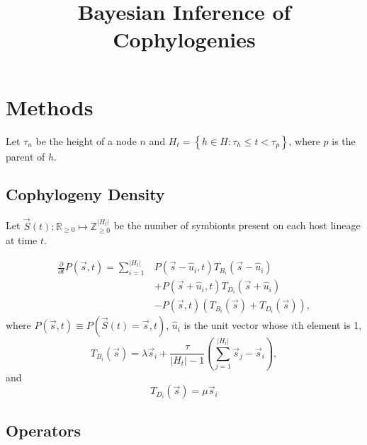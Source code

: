 \documentclass{article}
\title{Bayesian Inference of Cophylogenies}
\begin{document}
    \section*{Methods}

        Let $\tau_n$ be the height of a node $n$ and $H_t = \left\{h \in H:
        \tau_h \leq t < \tau_p\right\}$, where $p$ is the parent of $h$.

        \subsection*{Cophylogeny Density}

            Let $\vec{S}\left(t\right) : \mathbb{R}_{\geq 0} \mapsto
            \mathbb{Z}_{\geq 0}^{\lvert{H_t}\rvert}$ be the number of symbionts
            present on each host lineage at time $t$.

            \begin{equation}
                \begin{split}
                    \frac{\partial}{\partial t} P\left(\vec{s},t\right) =
                    \sum_{i=1}^{\lvert{H_t}\rvert}
                    &P\left(\vec{s} - \hat{u}_i, t\right)T_{B_i}\left(\vec{s} -
                    \hat{u}_i\right) \\ &+ P\left(\vec{s} + \hat{u}_i,
                    t\right)T_{D_i}\left(\vec{s} + \hat{u}_i \right) \\ &-
                    P\left(\vec{s}, t\right)\left(T_{B_i}\left(\vec{s}\right) +
                    T_{D_i}\left(\vec{s} \right)\right),
                \end{split}
            \end{equation}
            where $P\left(\vec{s}, t\right) \equiv P\left(\vec{S}\left(t\right)
            = \vec{s}, t\right)$, $\hat{u}_i$ is the unit vector whose $i$th
            element is 1,
            \begin{equation}
                T_{B_i}\left(\vec{s}\right) = \lambda \vec{s}_i +
                \frac{\tau}{\lvert{H_t}\rvert - 1}
                \left(\sum_{j=1}^{\lvert{H_t}\rvert}
                {\vec{s}_j}-\vec{s}_i\right),
            \end{equation}
            and
            \begin{equation}
                T_{D_i}\left(\vec{s}\right) = \mu \vec{s}_i
            \end{equation}

        \subsection*{Operators}
\end{document}
